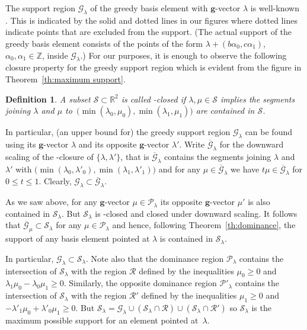 \documentclass{amsart}
\newtheorem{definition}[theorem]{Definition}
\numberwithin{theorem}{section}
\newcommand{\bfg}{\boldsymbol{g}}
\newcommand{\cG}{\mathcal{G}}
\newcommand{\cP}{\mathcal{P}}
\newcommand{\cR}{\mathcal{R}}
\newcommand{\cS}{\mathcal{S}}
\newcommand{\RR}{\mathbb{R}}
\newcommand{\ZZ}{\mathbb{Z}}
\begin{document}
  The support region $\cG_\lambda$ of the greedy basis element with $\bfg$-vector $\lambda$ is well-known \cite{CGMMRSW17,LLZ14}.
  This is indicated by the solid and dotted lines in our figures where dotted lines indicate points that are excluded from the support.
  (The actual support of the greedy basis element consists of the points of the form $\lambda+(b \alpha_0 ,c \alpha_1)$, $\alpha_0,\alpha_1\in\ZZ$, inside $\cG_\lambda$.)
  For our purposes, it is enough to observe the following closure property for the greedy support region which is evident from the figure in Theorem~\ref{th:maximum support}.
  \begin{definition}
    A subset $\cS\subset\RR^2$ is called \scalebox{1.7}{$\llcorner$}-closed if $\lambda,\mu\in\cS$ implies the segments joining $\lambda$ and $\mu$ to~$\big(\!\min(\lambda_0,\mu_0),\min(\lambda_1,\mu_1)\big)$ are contained in $\cS$.
  \end{definition}
  In particular, (an upper bound for) the greedy support region $\cG_\lambda$ can be found using its $\bfg$-vector $\lambda$ %
  and its opposite $\bfg$-vector $\lambda'$. %
  Write $\overline{\cG}_\lambda$ for the downward scaling of the \scalebox{1.7}{$\llcorner$}-closure of $\{\lambda,\lambda'\}$, that is $\overline{\cG}_\lambda$ contains the segments joining $\lambda$ and $\lambda'$ with $\big(\!\min(\lambda_0,\lambda'_0),\min(\lambda_1,\lambda'_1)\big)$ and for any $\mu\in\overline{\cG}_\lambda$ we have $t\mu\in\overline{\cG}_\lambda$ for $0\le t\le 1$.
  Clearly, $\cG_\lambda\subset\overline{\cG}_\lambda$.

  As we saw above, for any $\bfg$-vector $\mu\in\cP_\lambda$ its opposite $\bfg$-vector $\mu'$ is also contained in $\cS_\lambda$.
  But $\cS_\lambda$ is \scalebox{1.7}{$\llcorner$}-closed and closed under downward scaling. %
  It follows that $\overline{\cG}_\mu\subset\cS_\lambda$ for any $\mu\in\cP_\lambda$ and hence, following Theorem~\ref{th:dominance}, the support of any basis element pointed at $\lambda$ is contained in $\cS_\lambda$.

  In particular, $\cG_\lambda\subset\cS_\lambda$.
  Note also that the dominance region $\cP_\lambda$ contains the intersection of $\cS_\lambda$ with the region $\cR$ defined by the inequalities $\mu_0\ge0$ and $\lambda_1\mu_0-\lambda_0\mu_1\ge0$.
  Similarly, the opposite dominance region $\cP'_\lambda$ contains the intersection of $\cS_\lambda$ with the region $\cR'$ defined by the inequalities $\mu_1\ge0$ and $-\lambda'_1\mu_0+\lambda'_0\mu_1\ge0$.
  But $\cS_\lambda=\cG_\lambda\cup(\cS_\lambda\cap\cR)\cup(\cS_\lambda\cap\cR')$ so $\cS_\lambda$ is the maximum possible support for an element pointed at~$\lambda$.
\end{document}
